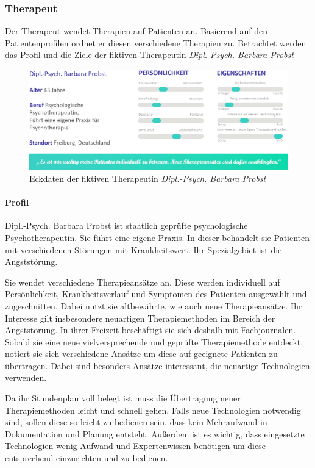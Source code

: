 \subsubsection{Therapeut}
Der Therapeut wendet Therapien auf Patienten an. Basierend auf den Patientenprofilen ordnet er diesen verschiedene Therapien zu. Betrachtet werden das Profil und die Ziele der fiktiven Therapeutin \emph{Dipl.-Psych. Barbara Probst}

\begin{figure}[h]
\centering
\includegraphics[width=1\textwidth]{pictures/therapeut}
\caption{Eckdaten der fiktiven Therapeutin \emph{Dipl.-Psych. Barbara Probst}}
\label{therapeut}
\end{figure}

\paragraph{Profil}
Dipl.-Psych. Barbara Probst ist staatlich geprüfte psychologische Psychotherapeutin. Sie führt eine eigene Praxis. In dieser behandelt sie Patienten mit verschiedenen Störungen mit Krankheitswert. Ihr Spezialgebiet ist die Angststörung.

Sie wendet verschiedene Therapieansätze an. Diese werden individuell auf Persönlichkeit, Krankheitsverlauf und Symptomen des Patienten ausgewählt und zugeschnitten. Dabei nutzt sie altbewährte, wie auch neue Therapieansätze. Ihr Interesse gilt insbesondere neuartigen Therapiemethoden im Bereich der Angststörung. In ihrer Freizeit beschäftigt sie sich deshalb mit Fachjournalen. Sobald sie eine neue vielversprechende und geprüfte Therapiemethode entdeckt, notiert sie sich verschiedene Ansätze um diese auf geeignete Patienten zu übertragen. Dabei sind besonders Ansätze interessant, die neuartige Technologien verwenden.

Da ihr Stundenplan voll belegt ist muss die Übertragung neuer Therapiemethoden leicht und schnell gehen. Falls neue Technologien notwendig sind, sollen diese so leicht zu bedienen sein, dass kein Mehraufwand in Dokumentation und Planung entsteht. Außerdem ist es wichtig, dass eingesetzte Technologien wenig Aufwand und Expertenwissen benötigen um diese entsprechend einzurichten und zu bedienen.

